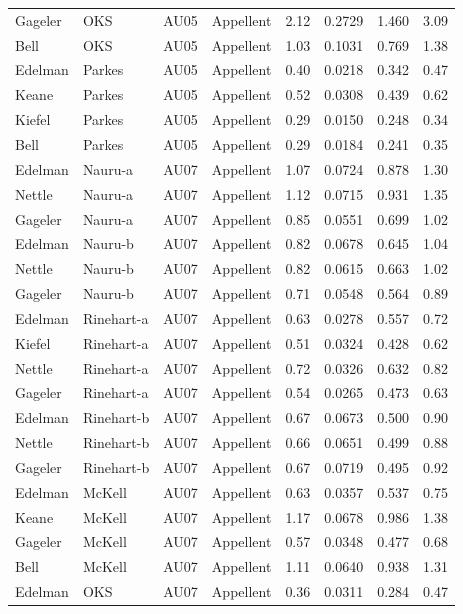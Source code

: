 \documentclass{monashthesis}
\begin{document}
\begin{center}
\begin{longtable}{llllllll}
Gageler & OKS & AU05 & Appellent & 2.12 & 0.2729 & 1.460 & 3.09 \\
Bell & OKS & AU05 & Appellent & 1.03 & 0.1031 & 0.769 & 1.38 \\
Edelman & Parkes & AU05 & Appellent & 0.40 & 0.0218 & 0.342 & 0.47 \\
Keane & Parkes & AU05 & Appellent & 0.52 & 0.0308 & 0.439 & 0.62 \\
Kiefel & Parkes & AU05 & Appellent & 0.29 & 0.0150 & 0.248 & 0.34 \\
Bell & Parkes & AU05 & Appellent & 0.29 & 0.0184 & 0.241 & 0.35 \\
Edelman & Nauru-a & AU07 & Appellent & 1.07 & 0.0724 & 0.878 & 1.30 \\
Nettle & Nauru-a & AU07 & Appellent & 1.12 & 0.0715 & 0.931 & 1.35 \\
Gageler & Nauru-a & AU07 & Appellent & 0.85 & 0.0551 & 0.699 & 1.02 \\
Edelman & Nauru-b & AU07 & Appellent & 0.82 & 0.0678 & 0.645 & 1.04 \\
Nettle & Nauru-b & AU07 & Appellent & 0.82 & 0.0615 & 0.663 & 1.02 \\
Gageler & Nauru-b & AU07 & Appellent & 0.71 & 0.0548 & 0.564 & 0.89 \\
Edelman & Rinehart-a & AU07 & Appellent & 0.63 & 0.0278 & 0.557 & 0.72 \\
Kiefel & Rinehart-a & AU07 & Appellent & 0.51 & 0.0324 & 0.428 & 0.62 \\
Nettle & Rinehart-a & AU07 & Appellent & 0.72 & 0.0326 & 0.632 & 0.82 \\
Gageler & Rinehart-a & AU07 & Appellent & 0.54 & 0.0265 & 0.473 & 0.63 \\
Edelman & Rinehart-b & AU07 & Appellent & 0.67 & 0.0673 & 0.500 & 0.90 \\
Nettle & Rinehart-b & AU07 & Appellent & 0.66 & 0.0651 & 0.499 & 0.88 \\
Gageler & Rinehart-b & AU07 & Appellent & 0.67 & 0.0719 & 0.495 & 0.92 \\
Edelman & McKell & AU07 & Appellent & 0.63 & 0.0357 & 0.537 & 0.75 \\
Keane & McKell & AU07 & Appellent & 1.17 & 0.0678 & 0.986 & 1.38 \\
Gageler & McKell & AU07 & Appellent & 0.57 & 0.0348 & 0.477 & 0.68 \\
Bell & McKell & AU07 & Appellent & 1.11 & 0.0640 & 0.938 & 1.31 \\
Edelman & OKS & AU07 & Appellent & 0.36 & 0.0311 & 0.284 & 0.47 \\

\end{longtable}
\end{center}
\end{document}
